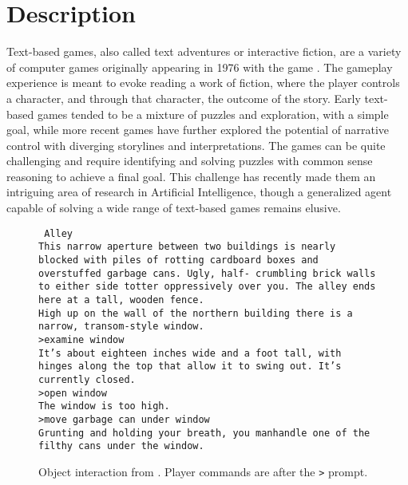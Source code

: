 \section{Description}

Text-based games, also called text adventures or interactive fiction,
are a variety of computer games originally appearing in 1976 with the
game \cite{crowther_adventure_1976}. The gameplay
experience is meant to evoke reading a work of fiction, where the
player controls a character, and through that character, the outcome of
the story. Early text-based games tended to be a mixture of puzzles and
exploration, with a simple goal, while more recent games have further
explored the potential of narrative control with diverging storylines
and interpretations. The games can be quite challenging and require
identifying and solving puzzles with common sense reasoning to achieve a
final goal. This challenge has recently made them an intriguing area of
research in Artificial Intelligence, though a generalized agent capable
of solving a wide range of text-based games remains
elusive\cite{cote_textworld_2019}.

\begin{wrapfigure}{R}{.45\textwidth}
    \small
    \raggedright
    \texttt{
        \noindent Alley\\
        This narrow aperture between two buildings is nearly blocked
        with piles of rotting cardboard boxes and overstuffed garbage
        cans. Ugly, half- crumbling brick walls to either side totter
        oppressively over you. The alley ends here at a tall, wooden
        fence.\\
        \medskip
        High up on the wall of the northern building there is a narrow,
        transom-style window.\\
        \medskip
        >examine window\\
        It's about eighteen inches wide and a foot tall, with hinges
        along the top that allow it to swing out. It's currently
        closed.\\
        \medskip
        >open window\\
        The window is too high.\\
        \medskip
        >move garbage can under window\\
        Grunting and holding your breath, you manhandle one of the
        filthy cans under the window.
    }
    \caption{Object interaction from
    \cite{gentry_anchorhead_1998}.  Player commands are
after the \texttt{>} prompt.}
\end{wrapfigure}

